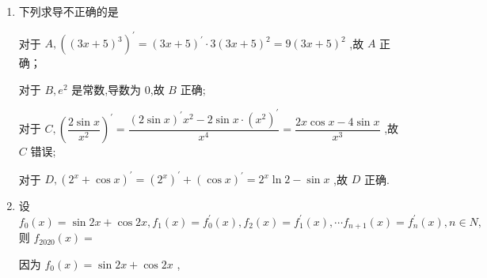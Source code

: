 \begin{enumerate}
\begin{enumerate}
\begin{jieda}
            对于 ${B}$ ,令 ${\left( \sqrt{{2x} - 1}\right) }^{\prime } = \dfrac{1}{2}{\left( 2x - 1\right) }^{-\frac{1}{2}} \cdot  2 = \dfrac{1}{\sqrt{{2x} - 1}}$ , B 正确;
            
            对于 ${C} : {\left\lbrack  \ln \left( 1 - 2x\right) \right\rbrack  }^{\prime } = \dfrac{1}{1 - {2x}} \cdot  \left( {-2}\right)  = \dfrac{2}{{2x} - 1},{C}$ 正确;
            
            对于 ${D} : {\left( \dfrac{x}{{{e}}^{x}}\right) }^{\prime } = \dfrac{{{e}}^{x} - x{{e}}^{x}}{{\left( {{e}}^{x}\right) }^{2}} = \dfrac{1 - x}{{{e}}^{x}}$ , ${D}$ 正确.
        \end{jieda}
        
        \item 下列求导不正确的是
        \begin{jieda}
            对于 ${A},{\left( {\left( 3x + 5\right) }^{3}\right) }^{\prime } = {\left( 3x + 5\right) }^{\prime } \cdot  3{\left( 3x + 5\right) }^{2} = 9{\left( 3x + 5\right) }^{2}$ ,故 ${A}$ 正确；
            
            对于 ${B},{{e}}^{2}$ 是常数,导数为 0,故 ${B}$ 正确;
            
            对于 ${C},{\left( \dfrac{2\sin x}{{x}^{2}}\right) }^{\prime } = \dfrac{{\left( 2\sin x\right) }^{\prime }{x}^{2} - 2\sin x \cdot  {\left( {x}^{2}\right) }^{\prime }}{{x}^{4}} = \dfrac{{2x}\cos x - 4\sin x}{{x}^{3}}$ ,故 ${C}$ 错误;
            
            对于 ${D},{\left( {2}^{x} + \cos x\right) }^{\prime } = {\left( {2}^{x}\right) }^{\prime } + {\left( \cos x\right) }^{\prime } = {2}^{x}\ln 2 - \sin x$ ,故 ${D}$ 正确.
        \end{jieda}
        
        \item 设 ${f}_{0}\left( x\right)  = \sin {2x} + \cos {2x},{f}_{1}\left( x\right)  = {f}_{0}^{\prime }\left( x\right) ,{f}_{2}\left( x\right)  = {f}_{1}^{\prime }\left( x\right) ,\cdots  {f}_{n + 1}\left( x\right)  = {f}_{n}^{\prime }\left( x\right) ,n \in  {N},$ 则 ${f}_{2020}\left( x\right)  =$
        \begin{jieda}
            因为 ${f}_{0}\left( x\right)  = \sin {2x} + \cos {2x}$ ,
            

\end{jieda}
\end{enumerate}
\end{enumerate}
